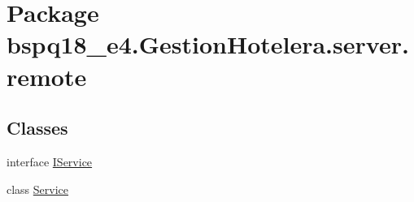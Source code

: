 \hypertarget{namespacebspq18__e4_1_1_gestion_hotelera_1_1server_1_1remote}{}\section{Package bspq18\+\_\+e4.\+Gestion\+Hotelera.\+server.\+remote}
\label{namespacebspq18__e4_1_1_gestion_hotelera_1_1server_1_1remote}
\subsection*{Classes}
\begin{DoxyCompactItemize}
\item 
interface \mbox{\hyperlink{interfacebspq18__e4_1_1_gestion_hotelera_1_1server_1_1remote_1_1_i_service}{I\+Service}}
\item 
class \mbox{\hyperlink{classbspq18__e4_1_1_gestion_hotelera_1_1server_1_1remote_1_1_service}{Service}}
\end{DoxyCompactItemize}
